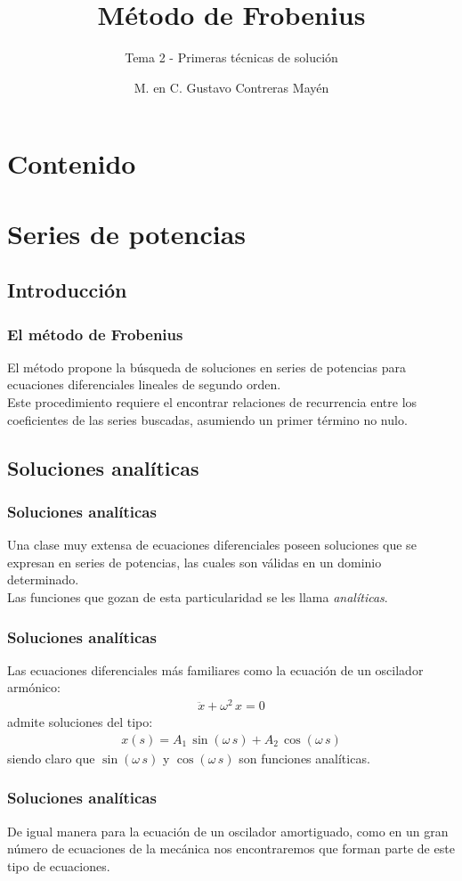 \documentclass[12pt]{beamer}
\date{}
\title{\large{Método de Frobenius}}
\subtitle{Tema 2 - Primeras técnicas de solución}
\author{M. en C. Gustavo Contreras Mayén}
\begin{document}
\maketitle
\fontsize{14}{14}\selectfont
{}

\section*{Contenido}


\section{Series de potencias}
\subsection{Introducción}

\begin{frame}
\frametitle{El método de Frobenius}
El método propone la búsqueda de soluciones en series de potencias para ecuaciones diferenciales lineales de segundo orden.
\\
\bigskip
\pause
Este procedimiento requiere el encontrar relaciones de recurrencia entre los coeficientes de las series buscadas, asumiendo un primer término no nulo.
\end{frame}

\subsection{Soluciones analíticas}

\begin{frame}
\frametitle{Soluciones analíticas}
Una clase muy extensa de ecuaciones diferenciales poseen soluciones que se expresan en series de potencias, las cuales son válidas en un dominio determinado.
\\
\bigskip
\pause
Las funciones que gozan de esta particularidad se les llama \emph{analíticas}.
\end{frame}
\begin{frame}
\frametitle{Soluciones analíticas}
Las ecuaciones diferenciales más familiares como la ecuación de un oscilador armónico:
\pause
\begin{align*}
\ddot{x} + \omega^{2} \, x = 0
\end{align*}
\pause
 admite soluciones del tipo:
\pause
\begin{align*}
x(s) = A_{1} \, \sin( \omega \, s) + A_{2} \, \cos (\omega \, s)
\end{align*}
siendo claro que $\sin( \omega \, s)$ y $\cos( \omega \, s)$ son funciones analíticas.
\end{frame}
\begin{frame}
\frametitle{Soluciones analíticas}
De igual manera para la ecuación de un oscilador amortiguado, como en un gran número de ecuaciones de la mecánica nos encontraremos que forman parte de este tipo de ecuaciones.
\end{frame}
\end{document}
